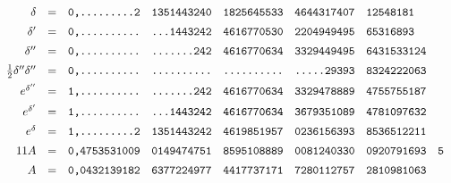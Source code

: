 \[\begin{array}{rcrlllll}
\delta&=&\text{\ttfamily 0,.........2}&\text{\ttfamily 1351443240}&\text{\ttfamily 1825645533}&\text{\ttfamily 4644317407}&\text{\ttfamily 12548181}&\\[5pt]
\delta'&=&\text{\ttfamily 0,..........}&\text{\ttfamily ...1443242}&\text{\ttfamily 4616770530}&\text{\ttfamily 2204949495}&\text{\ttfamily 65316893}&\\[5pt]
\delta''&=&\text{\ttfamily 0,..........}&\text{\ttfamily .......242}&\text{\ttfamily 4616770634}&\text{\ttfamily 3329449495}&\text{\ttfamily 6431533124}&\\[5pt]
\frac12\delta''\delta''&=&\text{\ttfamily 0,..........}&\text{\ttfamily ..........}&\text{\ttfamily ..........}&\text{\ttfamily .....29393}&\text{\ttfamily 8324222063}&\\[5pt]
e^{\delta''}&=&\text{\ttfamily 1,..........}&\text{\ttfamily .......242}&\text{\ttfamily 4616770634}&\text{\ttfamily 3329478889}&\text{\ttfamily 4755755187}&\\[5pt]
e^{\delta'}&=&\text{\ttfamily 1,..........}&\text{\ttfamily ...1443242}&\text{\ttfamily 4616770634}&\text{\ttfamily 3679351089}&\text{\ttfamily 4781097632}&\\[5pt]
e^\delta&=&\text{\ttfamily 1,.........2}&\text{\ttfamily 1351443242}&\text{\ttfamily 4619851957}&\text{\ttfamily 0236156393}&\text{\ttfamily 8536512211}&\\[5pt]
11A&=&\text{\ttfamily 0,4753531009}&\text{\ttfamily 0149474751}&\text{\ttfamily 8595108889}&\text{\ttfamily 0081240330}&\text{\ttfamily 0920791693}&\text{\ttfamily 5}\\[5pt]
A&=&\text{\ttfamily 0,0432139182}&\text{\ttfamily 6377224977}&\text{\ttfamily 4417737171}&\text{\ttfamily 7280112757}&\text{\ttfamily 2810981063}&
\end{array}
\]\endgroup

